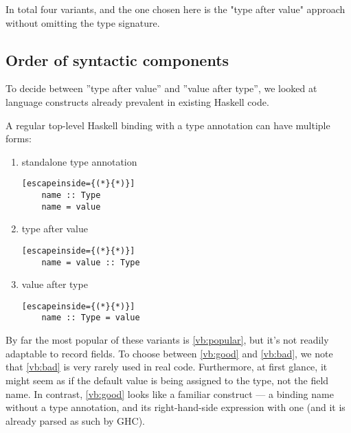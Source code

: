 \documentclass[en]{pracamgr}
\begin{document}
In total four variants, and the one chosen here is the "type after value" approach without omitting the type signature.
\subsection{Order of syntactic components}
To decide between ''type after value'' and ''value after type'', we looked at language constructs already prevalent in existing Haskell code.

A regular top-level Haskell binding with a type annotation can have multiple forms:
\begin{enumerate}
  \item \label{vb:popular} standalone type annotation
  \begin{lstlisting}[escapeinside={(*}{*)}]
    name :: Type 
    name = value
  \end{lstlisting}
  \item \label{vb:good} type after value
  \begin{lstlisting}[escapeinside={(*}{*)}]
    name = value :: Type
  \end{lstlisting}  
  \item \label{vb:bad} value after type
  \begin{lstlisting}[escapeinside={(*}{*)}]
    name :: Type = value
  \end{lstlisting}
\end{enumerate}

By far the most popular of these variants is \ref*{vb:popular}, but it's not readily adaptable to record fields.
To choose between \ref*{vb:good} and \ref*{vb:bad}, we note that \ref*{vb:bad} is very rarely used in real code.
Furthermore, at first glance, it might seem as if the default value is being assigned to the type, not the field name.
In contrast, \ref*{vb:good} looks like a familiar construct --- a binding name without a type annotation, and its right-hand-side expression with one (and it is already parsed as such by GHC).
\end{document}
